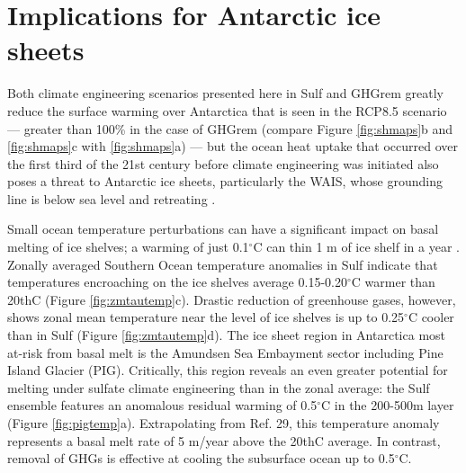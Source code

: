 \documentclass{nature}
\begin{document}
\section{Implications for Antarctic ice sheets}

Both climate engineering scenarios presented here in Sulf and GHGrem greatly reduce the surface warming over Antarctica that is seen in the RCP8.5 scenario --- greater than 100\% in the case of GHGrem (compare Figure \ref{fig:shmaps}b and \ref{fig:shmaps}c with \ref{fig:shmaps}a) --- but the ocean heat uptake that occurred over the first third of the 21st century before climate engineering was initiated also poses a threat to Antarctic ice sheets, particularly the WAIS, whose grounding line is below sea level \cite{joughin11} and retreating \cite{rignot14}. %

Small ocean temperature perturbations can have a significant impact on basal melting of ice shelves; a warming of just 0.1$^\circ$C can thin 1 m of ice shelf in a year \cite{rignot02}. Zonally averaged Southern Ocean temperature anomalies in Sulf indicate that temperatures encroaching on the ice shelves average 0.15-0.20$^\circ$C warmer than 20thC (Figure \ref{fig:zmtautemp}c). Drastic reduction of greenhouse gases, however, shows zonal mean temperature near the level of ice shelves is up to 0.25$^\circ$C cooler than in Sulf (Figure \ref{fig:zmtautemp}d). The ice sheet region in Antarctica most at-risk from basal melt is the Amundsen Sea Embayment sector including Pine Island Glacier (PIG). Critically, this region reveals an even greater potential for melting under sulfate climate engineering than in the zonal average: the Sulf ensemble features an anomalous residual warming of 0.5$^\circ$C in the 200-500m layer (Figure \ref{fig:pigtemp}a). Extrapolating from Ref. 29, this temperature anomaly represents a basal melt rate of 5 m/year above the 20thC average. In contrast, removal of GHGs is effective at cooling the subsurface ocean up to 0.5$^\circ$C. %
\end{document}
